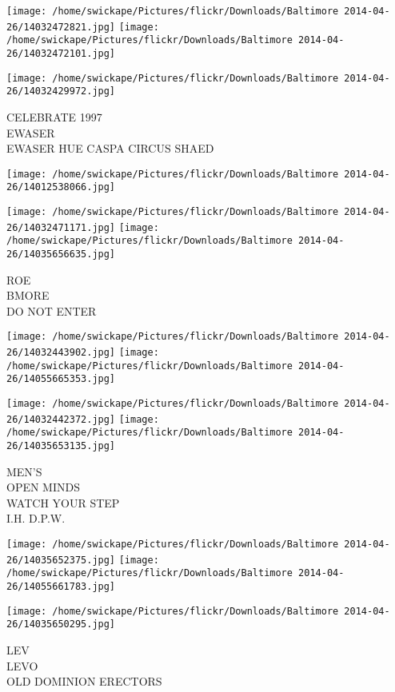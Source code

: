 \documentclass[10pt,letterpaper]{article}
\begin{document}
\texttt{[image: /home/swickape/Pictures/flickr/Downloads/Baltimore 2014-04-26/14032472821.jpg]}
\texttt{[image: /home/swickape/Pictures/flickr/Downloads/Baltimore 2014-04-26/14032472101.jpg]}

\vspace{0.25in}
\texttt{[image: /home/swickape/Pictures/flickr/Downloads/Baltimore 2014-04-26/14032429972.jpg]}

CELEBRATE 1997\\
EWASER\\
EWASER HUE CASPA CIRCUS SHAED
\pagebreak

\texttt{[image: /home/swickape/Pictures/flickr/Downloads/Baltimore 2014-04-26/14012538066.jpg]}

\vspace{0.25in}
\texttt{[image: /home/swickape/Pictures/flickr/Downloads/Baltimore 2014-04-26/14032471171.jpg]}
\texttt{[image: /home/swickape/Pictures/flickr/Downloads/Baltimore 2014-04-26/14035656635.jpg]}

ROE\\
BMORE\\
DO NOT ENTER
\pagebreak

\texttt{[image: /home/swickape/Pictures/flickr/Downloads/Baltimore 2014-04-26/14032443902.jpg]}
\texttt{[image: /home/swickape/Pictures/flickr/Downloads/Baltimore 2014-04-26/14055665353.jpg]}

\texttt{[image: /home/swickape/Pictures/flickr/Downloads/Baltimore 2014-04-26/14032442372.jpg]}
\texttt{[image: /home/swickape/Pictures/flickr/Downloads/Baltimore 2014-04-26/14035653135.jpg]}

MEN'S\\
OPEN MINDS\\
WATCH YOUR STEP\\
I.H. D.P.W.
\pagebreak

\texttt{[image: /home/swickape/Pictures/flickr/Downloads/Baltimore 2014-04-26/14035652375.jpg]}
\texttt{[image: /home/swickape/Pictures/flickr/Downloads/Baltimore 2014-04-26/14055661783.jpg]}

\vspace{0.25in}
\texttt{[image: /home/swickape/Pictures/flickr/Downloads/Baltimore 2014-04-26/14035650295.jpg]}

LEV\\
LEVO\\
OLD DOMINION ERECTORS
\pagebreak
\end{document}
